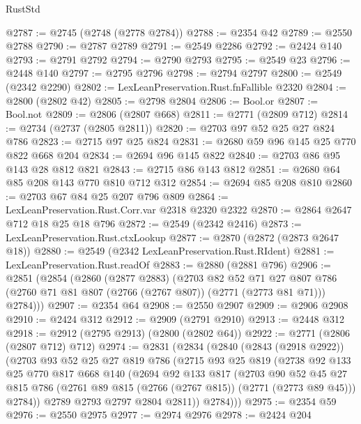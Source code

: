 \begin{lexlean}{RustStd}
\begin{coremodule}
@2787 := @2745 (@2748 (@2778 @2784))
@2788 := @2354 @42
@2789 := @2550 @2788
@2790 := @2787 @2789
@2791 := @2549 @2286
@2792 := @2424 @140
@2793 := @2791 @2792
@2794 := @2790 @2793
@2795 := @2549 @23
@2796 := @2448 @140
@2797 := @2795 @2796
@2798 := @2794 @2797
@2800 := @2549 (@2342 @2290)
@2802 := LexLeanPreservation.Rust.fnFallible @2320
@2804 := @2800 (@2802 @42)
@2805 := @2798 @2804
@2806 := Bool.or
@2807 := Bool.not
@2809 := @2806 (@2807 @668)
@2811 := @2771 (@2809 @712)
@2814 := @2734 (@2737 (@2805 @2811))
@2820 := @2703 @97 @52 @25 @27 @824 @786
@2823 := @2715 @97 @25 @824
@2831 := @2680 @59 @96 @145 @25 @770 @822 @668 @204
@2834 := @2694 @96 @145 @822
@2840 := @2703 @86 @95 @143 @28 @812 @821
@2843 := @2715 @86 @143 @812
@2851 := @2680 @64 @85 @208 @143 @770 @810 @712 @312
@2854 := @2694 @85 @208 @810
@2860 := @2703 @67 @84 @25 @207 @796 @809
@2864 := LexLeanPreservation.Rust.Corr.var @2318 @2320 @2322
@2870 := @2864 @2647 @712 @18 @25 @18 @796
@2872 := @2549 (@2342 @2416)
@2873 := LexLeanPreservation.Rust.ctxLookup
@2877 := @2870 (@2872 (@2873 @2647 @18))
@2880 := @2549 (@2342 LexLeanPreservation.Rust.RIdent)
@2881 := LexLeanPreservation.Rust.readOf
@2883 := @2880 (@2881 @796)
@2906 := @2851
    (@2854
      (@2860
        (@2877 @2883)
        (@2703
          @82
          @52
          @71
          @27
          @807
          @786
          (@2760 @71 @81 @807 (@2766 (@2767 @807)) (@2771 (@2773 @81 @71)))
          @2784)))
@2907 := @2354 @64
@2908 := @2550 @2907
@2909 := @2906 @2908
@2910 := @2424 @312
@2912 := @2909 (@2791 @2910)
@2913 := @2448 @312
@2918 := @2912 (@2795 @2913) (@2800 (@2802 @64))
@2922 := @2771 (@2806 (@2807 @712) @712)
@2974 := @2831
    (@2834
      (@2840
        (@2843 (@2918 @2922))
        (@2703
          @93
          @52
          @25
          @27
          @819
          @786
          (@2715
            @93
            @25
            @819
            (@2738
              @92
              @133
              @25
              @770
              @817
              @668
              @140
              (@2694
                @92
                @133
                @817
                (@2703
                  @90
                  @52
                  @45
                  @27
                  @815
                  @786
                  (@2761 @89 @815 (@2766 (@2767 @815)) (@2771 (@2773 @89 @45)))
                  @2784))
              @2789
              @2793
              @2797
              @2804
              @2811))
          @2784)))
@2975 := @2354 @59
@2976 := @2550 @2975
@2977 := @2974 @2976
@2978 := @2424 @204

\end{coremodule}
\end{lexlean}
